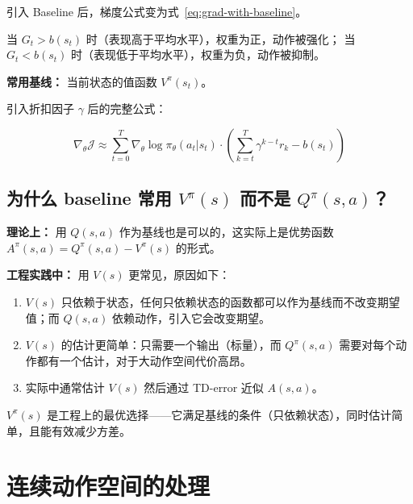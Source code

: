 \documentclass[12pt,a4paper]{article}
\newcommand{\grad}{\nabla}
\theoremstyle{noteplain}
\theoremstyle{noteexercise}
\begin{document}
引入 Baseline 后，梯度公式变为式~\eqref{eq:grad-with-baseline}。

当 $G_t > b(s_t)$ 时（表现高于平均水平），权重为正，动作被强化；
当 $G_t < b(s_t)$ 时（表现低于平均水平），权重为负，动作被抑制。

\textbf{常用基线：} 当前状态的值函数 $V^\pi(s_t)$。

引入折扣因子 $\gamma$ 后的完整公式：

\begin{equation}\label{eq:grad-discounted-baseline}
  \grad_\theta \mathcal{J} \approx
  \sum_{t=0}^{T} \grad_\theta \log \pi_\theta(a_t|s_t) \cdot
  \left( \sum_{k=t}^{T} \gamma^{k-t} r_k - b(s_t) \right)
\end{equation}

\subsection{为什么 baseline 常用 $V^\pi(s)$ 而不是 $Q^\pi(s,a)$？}\label{ssec:v-vs-q}

\textbf{理论上：} 用 $Q(s,a)$ 作为基线也是可以的，这实际上是优势函数 $A^\pi(s,a) = Q^\pi(s,a) - V^\pi(s)$ 的形式。

\textbf{工程实践中：} 用 $V(s)$ 更常见，原因如下：

\begin{enumerate}
  \setlength{\itemsep}{0.3em}
  \item $V(s)$ 只依赖于状态，任何只依赖状态的函数都可以作为基线而不改变期望值；而 $Q(s,a)$ 依赖动作，引入它会改变期望。
  \item $V(s)$ 的估计更简单：只需要一个输出（标量），而 $Q^\pi(s,a)$ 需要对每个动作都有一个估计，对于大动作空间代价高昂。
  \item 实际中通常估计 $V(s)$ 然后通过 TD-error 近似 $A(s,a)$。
\end{enumerate}

\begin{keypoint}[总结]
  $V^\pi(s)$ 是工程上的最优选择——它满足基线的条件（只依赖状态），同时估计简单，且能有效减少方差。
\end{keypoint}

\section{连续动作空间的处理}\label{sec:continuous}
\end{document}
